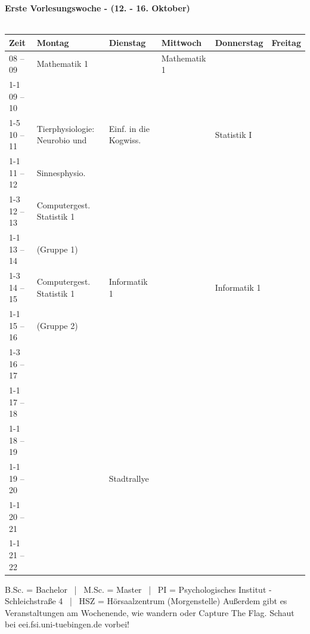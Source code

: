 \textbf{Erste Vorlesungswoche - (12. - 16. Oktober)}\\
\\
\begin{tabular}{|l|p{}|p{}|p{}|p{}|p{}|} \hline
	Zeit & Montag & Dienstag & Mittwoch & Donnerstag & Freitag \\ 
	\hline \hline
 08 -- 09 & \footnotesize{Mathematik 1} & & \footnotesize{Mathematik 1} & & \\ \cline{1-1}
 09 -- 10 & & & & & \\ \cline{1-5}
 10 -- 11 & \footnotesize{Tierphysiologie: Neurobio und} & \footnotesize{Einf. in die Kogwiss.} & & \footnotesize{Statistik I} & \\ \cline{1-1} 
 11 -- 12 & \footnotesize{Sinnesphysio.} &  & &  & \\ \cline{1-3} \cline{5-5}
 12 -- 13 & \footnotesize{Computergest. Statistik 1}& & & & \\ \cline{1-1}
 13 -- 14 & \footnotesize{(Gruppe 1)}& & & & \\ \cline{1-3} \cline{5-5}
 14 -- 15 & \footnotesize{Computergest. Statistik 1} & \footnotesize{Informatik 1} & & \footnotesize{Informatik 1} & \\  \cline {1-1}
 15 -- 16 & \footnotesize{(Gruppe 2)} &  & & & \\ \cline{1-3} \cline{5-5}
 16 -- 17 & & & & & \\ \cline{1-1}
 17 -- 18 & & & & & \\ \cline{1-1}
 18 -- 19 & & & & & \\ \cline{1-1}
 19 -- 20 & & \cellcolor{lightlightgray} \footnotesize{Stadtrallye} & & & \\ \cline{1-1}
 20 -- 21 & &\cellcolor{lightlightgray} & & &\\ \cline{1-1}
 21 -- 22 & &\cellcolor{lightlightgray} & & &\\ \hline
\end{tabular}

\scriptsize{B.Sc. = Bachelor ~|~ M.Sc. = Master ~|~ PI = Psychologisches Institut - Schleichstraße 4 ~|~ HSZ = Hörsaalzentrum (Morgenstelle)}
\scriptsize{Außerdem gibt es Veranstaltungen am Wochenende, wie wandern oder Capture The Flag. Schaut bei eei.fsi.uni-tuebingen.de vorbei!}

